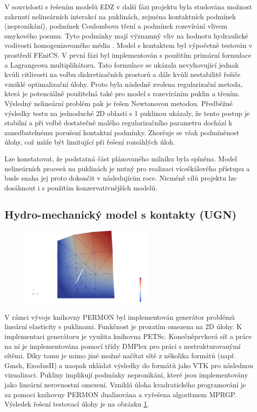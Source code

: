 \documentclass[11pt,a4paper]{article}
\begin{document}
\begin{onehalfspacing}
V souvislosti s řešením modelů EDZ v další fázi projektu byla studována možnost zahrnutí nelineárních 
interakcí na puklinách, zejména kontaktních podmínek (nepronikání), podmínek Coulombova tření a podmínek rozevírání vlivem smykového posunu.
Tyto podmínky mají významný vliv na hodnotu hydraulické vodivosti homogenizovaného média \cite{min_2004}.
Model s kontaktem byl výpočetně testován v prostředí FEniCS. V první fázi byl implementován s použitím primární formulace 
a Lagrangeova multiplikátoru. Tato formulace se ukázala nevyhovující jednak kvůli citlivosti na volbu diskretizačních 
prostorů a dále kvůli nestabilitě řešiče vzniklé optimalizační úlohy. Proto byla následně zvolena regularizační metoda, 
která je potenciálně použitelná také pro model s rozevíráním puklin a třením. Výsledný nelineární problém pak je řešen 
Newtonovou metodou. Předběžné výsledky testu na jednoduché 2D oblasti s 1 puklinou ukázaly, že tento postup je stabilní 
a při volbě dostatečně malého regularizačního parametru dochází k zanedbatelnému porušení kontaktní podmínky. Zhoršuje 
se však podmíněnost úlohy, což může být limitující při řešení rozsáhlých úloh.

Lze konstatovat, že podstatná část plánovaného milníku byla splněna. Model nelineárních procesů na puklinách je nutný pro
realizaci víceškálového přístupu a bude snaha jej proto dokončit v následujícím roce. Nicméně cílů projektu lze dosáhnout
i s použitím konzervativnějších modelů.


\subsection{Hydro-mechanický model s kontakty (UGN)}
\begin{figure}
    \centering
    \includegraphics[width=0.6\textwidth]{graphics/ugn_permon_pull.png}
    \caption{}
    \label{fig:ugn_pull}
\end{figure}

V rámci vývoje knihovny PERMON byl implementován generátor problémů lineární
elasticity s puklinami. Funkčnost je prozatím omezena na 2D úlohy. K
implementaci generátoru je využita knihovna PETSc. Konečněprvková síť a
práce na ní je implementována pomocí třídy DMPlex pro práci s
nestrukturovanýmí sítěmi. Díky tomu je mimo jiné možné načítat sítě z
několika formátů (např. Gmsh, ExodusII) a naopak ukládat výsledky do
formátů jako VTK pro následnou vizualizaci. Pukliny implikují podmínky
nepronikání, které jsou implementovány jako lineární nerovnostní
omezení. Vzniklá úloha kvadratického programování je za pomoci knihovny
PERMON dualizována a vyřešena algoritmem MPRGP. 
Výsledek řešení testovací úlohy je na obrázku \ref{fig:ugn_pull}.





\end{onehalfspacing}
\end{document}
